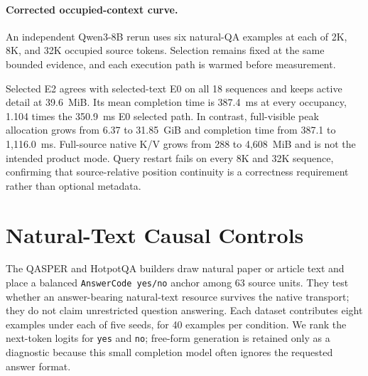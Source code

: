 \documentclass[10pt]{article}
\begin{document}
\paragraph{Corrected occupied-context curve.}
An independent Qwen3-8B rerun uses six natural-QA examples at each of 2K, 8K,
and 32K occupied source tokens. Selection remains fixed at the same bounded
evidence, and each execution path is warmed before measurement.

\begin{table}[H]
\centering
\scriptsize
\caption{Corrected occupied-context pressure. Selected detail stays fixed as
the distractor-bearing visible context grows. Times are in-process completion
latencies and do not estimate queued tails.}

\label{tab:mlx-corrected-pressure}
\end{table}

Selected E2 agrees with selected-text E0 on all 18 sequences and keeps active
detail at 39.6~MiB. Its mean completion time is 387.4~ms at every occupancy,
1.104 times the 350.9~ms E0 selected path. In contrast, full-visible peak
allocation grows from 6.37 to 31.85~GiB and completion time from 387.1 to
1,116.0~ms. Full-source native K/V grows from 288 to 4,608~MiB and is not the
intended product mode. Query restart fails on every 8K and 32K sequence,
confirming that source-relative position continuity is a correctness
requirement rather than optional metadata.

\section{Natural-Text Causal Controls}
The QASPER and HotpotQA builders draw natural paper or article text and place a
balanced \texttt{AnswerCode yes/no} anchor among 63 source units. They test
whether an answer-bearing natural-text resource survives the native transport;
they do not claim unrestricted question answering. Each dataset contributes
eight examples under each of five seeds, for 40 examples per condition. We rank
the next-token logits for \texttt{yes} and \texttt{no}; free-form generation is
retained only as a diagnostic because this small completion model often ignores
the requested answer format.

\begin{table}[!htbp]
\centering
\small
\caption{Natural-text transport controls. Margin is the mean gold-minus-other
answer logit.}

\label{tab:mlx-natural}
\end{table}
\end{document}
